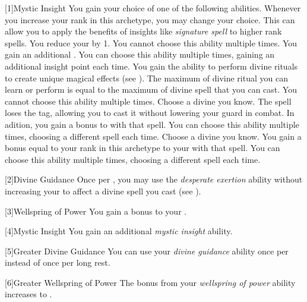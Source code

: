         [1]{Mystic Insight}
        You gain your choice of one of the following abilities.
        Whenever you increase your rank in this archetype, you may change your choice.
        This can allow you to apply the benefits of insights like \textit{signature spell} to higher rank spells.
        {
             You reduce your  by 1.
                You cannot choose this ability multiple times.
             You gain an additional .
                You can choose this ability multiple times, gaining an additional insight point each time.
             You gain the ability to perform divine rituals to create unique magical effects (see ).
                The maximum  of divine ritual you can learn or perform is equal to the maximum  of divine spell that you can cast.
                You cannot choose this ability multiple times.
             Choose a divine  you know.
                The spell loses the  tag, allowing you to cast it without lowering your guard in combat.
                In adition, you gain a  bonus to  with that spell.
                You can choose this ability multiple times, choosing a different spell each time.
             Choose a divine  you know.
                You gain a bonus equal to your rank in this archetype to your  with that spell.
                You can choose this ability multiple times, choosing a different spell each time.
        }

        [2]{Divine Guidance} Once per , you may use the \textit{desperate exertion} ability without increasing your  to affect a divine spell you cast (see ).

        [3]{Wellspring of Power}
        You gain a  bonus to your  .

        [4]{Mystic Insight}
        You gain an additional \textit{mystic insight} ability.

        [5]{Greater Divine Guidance} You can use your \textit{divine guidance} ability once per  instead of once per long rest.

        [6]{Greater Wellspring of Power} The bonus from your \textit{wellspring of power} ability increases to .

